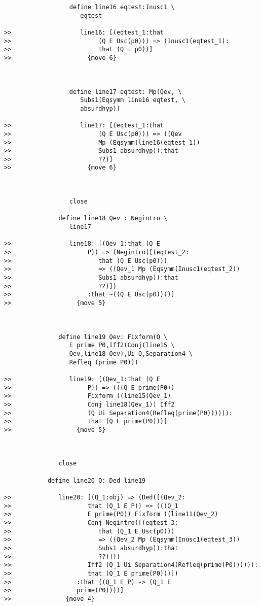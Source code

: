 \documentclass[12pt]{article}
\begin{document}
\begin{verbatim}
                  define line16 eqtest:Inusc1 \
                     eqtest

>>                   line16: [(eqtest_1:that
>>                        (Q E Usc(p0))) => (Inusc1(eqtest_1):
>>                        that (Q = p0))]
>>                     {move 6}



                  define line17 eqtest: Mp(Qev, \
                     Subs1(Eqsymm line16 eqtest, \
                     absurdhyp))

>>                   line17: [(eqtest_1:that
>>                        (Q E Usc(p0))) => ((Qev
>>                        Mp (Eqsymm(line16(eqtest_1))
>>                        Subs1 absurdhyp)):that
>>                        ??)]
>>                     {move 6}



                  close

               define line18 Qev : Negintro \
                  line17

>>                line18: [(Qev_1:that (Q E
>>                     P)) => (Negintro([(eqtest_2:
>>                        that (Q E Usc(p0)))
>>                        => ((Qev_1 Mp (Eqsymm(Inusc1(eqtest_2))
>>                        Subs1 absurdhyp)):that
>>                        ??)])
>>                     :that ~((Q E Usc(p0))))]
>>                  {move 5}



               define line19 Qev: Fixform(Q \
                  E prime P0,Iff2(Conj(line15 \
                  Qev,line18 Qev),Ui Q,Separation4 \
                  Refleq (prime P0)))

>>                line19: [(Qev_1:that (Q E
>>                     P)) => (((Q E prime(P0))
>>                     Fixform ((line15(Qev_1)
>>                     Conj line18(Qev_1)) Iff2
>>                     (Q Ui Separation4(Refleq(prime(P0)))))):
>>                     that (Q E prime(P0)))]
>>                  {move 5}



               close

            define line20 Q: Ded line19

>>             line20: [(Q_1:obj) => (Ded([(Qev_2:
>>                     that (Q_1 E P)) => (((Q_1
>>                     E prime(P0)) Fixform ((line11(Qev_2)
>>                     Conj Negintro([(eqtest_3:
>>                        that (Q_1 E Usc(p0)))
>>                        => ((Qev_2 Mp (Eqsymm(Inusc1(eqtest_3))
>>                        Subs1 absurdhyp)):that
>>                        ??)]))
>>                     Iff2 (Q_1 Ui Separation4(Refleq(prime(P0)))))):
>>                     that (Q_1 E prime(P0)))])
>>                  :that ((Q_1 E P) -> (Q_1 E
>>                  prime(P0))))]
>>               {move 4}




\end{verbatim}
\end{document}
